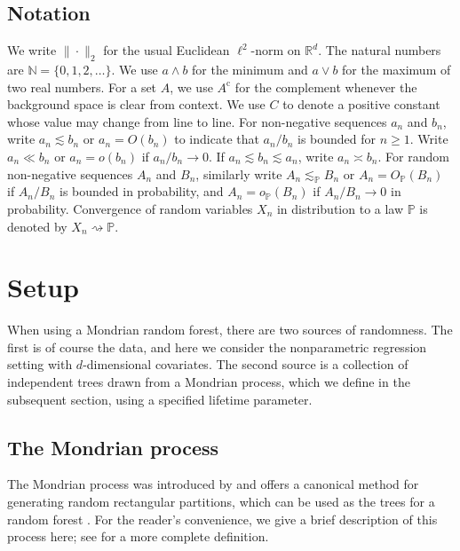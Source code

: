 \documentclass[11pt,lof]{puthesis}
\renewcommand{\P}{\ensuremath{\mathbb{P}}}
\newcommand{\N}{\ensuremath{\mathbb{N}}}
\newcommand{\R}{\ensuremath{\mathbb{R}}}
\newcommand{\comp}{\ensuremath{\mathrm{c}}}
\theoremstyle{break}
\theoremstyle{proof}
\begin{document}
\subsection{Notation}

We write $\|\cdot\|_2$ for the usual Euclidean $\ell^2$-norm on $\R^d$. The
natural numbers are $\N = \{0, 1, 2, \ldots \}$. We use $a \wedge b$ for the
minimum and $a \vee b$ for the maximum of two real numbers. For a set $A$, we
use $A^{\comp}$ for the complement whenever the background space is clear from
context. We use $C$ to denote a positive constant whose value may change from
line to line. For non-negative sequences $a_n$ and $b_n$, write
$a_n \lesssim b_n$ or $a_n = O(b_n)$ to indicate that $a_n / b_n$ is bounded
for $n\geq 1$. Write $a_n \ll b_n$ or $a_n = o(b_n)$ if $a_n / b_n \to 0$. If
$a_n \lesssim b_n \lesssim a_n$, write $a_n \asymp b_n$. For random
non-negative sequences $A_n$ and $B_n$, similarly write $A_n \lesssim_\P B_n$
or $A_n = O_\P(B_n)$ if $A_n / B_n$ is bounded in probability,
and $A_n = o_\P(B_n)$ if $A_n / B_n \to 0$ in probability. Convergence of
random variables $X_n$ in distribution to a law $\P$ is denoted by
$X_n \rightsquigarrow \P$.

\section{Setup}
\label{sec:mondrian_setup}

When using a Mondrian random forest, there are two sources of randomness. The
first is of course the data, and here we consider the nonparametric regression
setting with $d$-dimensional covariates. The second source is a collection of
independent trees drawn from a Mondrian process, which we define in the
subsequent section, using a specified lifetime parameter.

\subsection{The Mondrian process}
\label{sec:mondrian_process}

The Mondrian process was introduced by \citet{roy2008mondrian} and offers a
canonical method for generating random rectangular partitions, which can be
used as the trees for a random forest
\citep{lakshminarayanan2014mondrian,lakshminarayanan2016mondrian}. For
the reader's convenience, we give a brief description of this process here; see
\citet[Section~3]{mourtada2020minimax} for a more complete definition.
\end{document}
